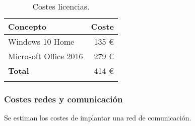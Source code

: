 \begin{longtable}[]{@{}lr@{}}
\toprule
\begin{minipage}[b]{0.38\columnwidth}\raggedright\strut
\textbf{Concepto}\strut
\end{minipage} & \begin{minipage}[b]{0.20\columnwidth}\raggedright\strut
\textbf{Coste}\strut
\end{minipage}\tabularnewline
\midrule
\endhead

\begin{minipage}[t]{0.38\columnwidth}\raggedright\strut
Windows 10 Home \cite{pago:w10} \strut
\end{minipage} & \begin{minipage}[t]{0.20\columnwidth}\raggedright\strut
135 \euro{}\strut
\end{minipage}\tabularnewline

\begin{minipage}[t]{0.38\columnwidth}\raggedright\strut
Microsoft Office 2016 \cite{pago:office} \strut
\end{minipage} & \begin{minipage}[t]{0.20\columnwidth}\raggedright\strut
279 \euro{}\strut
\end{minipage}\tabularnewline

\midrule

\begin{minipage}[t]{0.38\columnwidth}\raggedright\strut
\textbf{Total}\strut
\end{minipage} & \begin{minipage}[t]{0.20\columnwidth}\raggedright\strut
414 \euro{}\strut
\end{minipage}\tabularnewline
\bottomrule
\caption{Costes licencias.}
\end{longtable}

\subsubsection{Costes redes y comunicación}

Se estiman los costes de implantar una red de comunicación.

